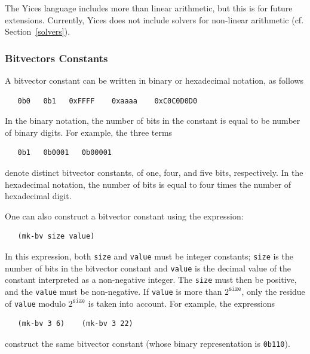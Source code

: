 \documentclass[11pt,twoside,fleqn,openright,titlepage]{cslreport}
\begin{document}
\medskip\noindent
The Yices language includes more than linear arithmetic, but this is
for future extensions. Currently, Yices does not include solvers for
non-linear arithmetic (cf. Section~\ref{solvers}).

\subsubsection*{Bitvectors Constants}

A bitvector constant can be written in binary or hexadecimal notation, as follows
\begin{small}
\begin{verbatim}
   0b0   0b1   0xFFFF    0xaaaa    0xC0C0D0D0
\end{verbatim}
\end{small}
In the binary notation, the number of bits in the constant is equal to
be number of binary digits. For example, the three terms
\begin{small}
\begin{verbatim}
   0b1   0b0001   0b00001
\end{verbatim}
\end{small}
denote distinct bitvector constants, of one, four, and five bits, respectively.
In the hexadecimal notation, the number of bits is equal to four times the number
of hexadecimal digit.

\medskip\noindent
One can also construct a bitvector constant using the expression:
\begin{small}
\begin{verbatim}
   (mk-bv size value)
\end{verbatim}
\end{small}
In this expression, both \texttt{size} and \texttt{value} must be
integer constants; \texttt{size} is the number of bits in the
bitvector constant and \texttt{value} is the decimal value of the
constant interpreted as a non-negative integer. The \texttt{size}
must then be positive, and the \texttt{value} must be
non-negative. If \texttt{value} is more than $2^{\mathtt{size}}$,
only the residue of \texttt{value} modulo $2^{\mathtt{size}}$ is
taken into account. For example, the expressions
\begin{small}
\begin{verbatim}
   (mk-bv 3 6)    (mk-bv 3 22)
\end{verbatim}
\end{small}
construct the same bitvector constant (whose binary representation is
\texttt{0b110}).
\end{document}
